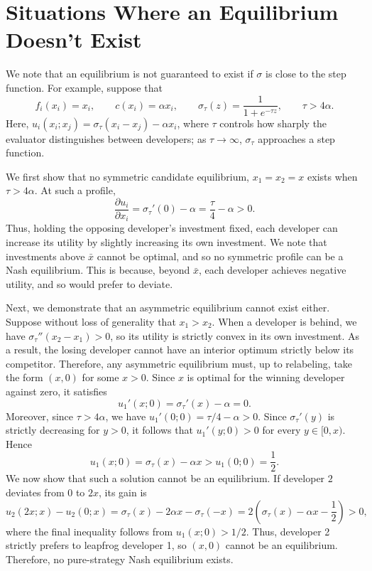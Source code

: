 \section{Situations Where an Equilibrium Doesn't Exist}
\label{app:no_equilibrium}
We note that an equilibrium is not guaranteed to exist if $\sigma$ is close to the step function. 
For example, suppose that 
\[
f_i(x_i)=x_i, \qquad c(x_i)=\alpha x_i, \qquad \sigma_\tau(z)=\frac{1}{1+e^{-\tau z}}, \qquad \tau > 4 \alpha.
\]
Here, $u_i(x_i;x_j)=\sigma_\tau(x_i-x_j)-\alpha x_i$, where $\tau$ controls how sharply the evaluator distinguishes between developers; as $\tau\rightarrow\infty$, $\sigma_\tau$ approaches a step function.

We first show that no symmetric candidate equilibrium, $x_1=x_2=x$ exists when $\tau  > 4\alpha$. 
At such a profile,
\[ 
\frac{\partial u_i}{\partial x_i}=\sigma_\tau'(0)-\alpha=\frac{\tau}{4}-\alpha > 0.
\] 
Thus, holding the opposing developer's investment fixed, each developer can increase its utility by slightly increasing its own investment. 
We note that investments above $\bar{x}$ cannot be optimal, and so no symmetric profile can be a Nash equilibrium.
This is because, beyond $\bar{x}$, each developer achieves negative utility, and so would prefer to deviate. 


Next, we demonstrate that an asymmetric equilibrium cannot exist either. 
Suppose without loss of generality that $x_1>x_2$. 
When a developer is behind, we have \(\sigma_\tau''(x_2-x_1)>0\), so its utility is strictly convex in its own investment. 
As a result, the losing developer cannot have an interior optimum strictly below its competitor. 
Therefore, any asymmetric equilibrium must, up to relabeling, take the form \((x,0)\) for some \(x>0\).
Since $x$ is optimal for the winning developer against zero, it satisfies
\[
u_1'(x;0)=\sigma_\tau'(x)-\alpha=0.
\]
Moreover, since $\tau>4\alpha$, we have $u_1'(0;0)=\tau/4-\alpha>0$. 
Since $\sigma_\tau'(y)$ is strictly decreasing for $y>0$, it follows that $u_1'(y;0)>0$ for every $y\in[0,x)$. Hence
\[
u_1(x;0)=\sigma_\tau(x)-\alpha x>u_1(0;0)=\frac12.
\]
We now show that such a solution cannot be an equilibrium. 
If developer $2$ deviates from $0$ to $2x$, its gain is
\[
u_2(2x;x)-u_2(0;x)
=\sigma_\tau(x)-2\alpha x-\sigma_\tau(-x)
=2\left(\sigma_\tau(x)-\alpha x-\frac12\right)>0,
\]
where the final inequality follows from \(u_1(x;0)>1/2\). Thus, developer 2 strictly prefers to leapfrog developer 1, so \((x,0)\) cannot be an equilibrium. Therefore, no pure-strategy Nash equilibrium exists.